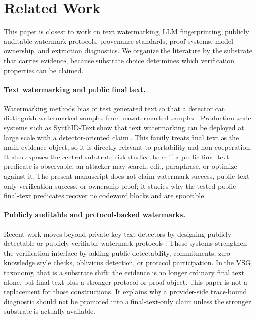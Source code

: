 \section{Related Work}
\label{sec:related}

This paper is closest to work on text watermarking, LLM fingerprinting,
publicly auditable watermark protocols, provenance standards, proof systems,
model ownership, and extraction diagnostics.  We organize the literature by
the substrate that carries evidence, because substrate choice determines which
verification properties can be claimed.

\paragraph{Text watermarking and public final text.}
Watermarking methods bias or test generated text so that a detector can
distinguish watermarked samples from unwatermarked samples
\cite{kirchenbauer2023watermark,zhao2023provable,hu2024unbiased,kuditipudi2024robust,christ2023undetectable,lee2024who,chang2024postmark,huang2025waterpool,dabiriaghdam2025simmark,wouters2024optimizing,liu2024adaptive,zhu2024duwak,lau2024waterfall,jiang2025stealthink}.
Production-scale systems such as SynthID-Text show that text watermarking can
be deployed at large scale with a detector-oriented claim
\cite{dathathri2024scalable}.  This family treats final text as the main
evidence object, so it is directly relevant to portability and
non-cooperation.  It also exposes the central substrate risk studied here: if
a public final-text predicate is observable, an attacker may search, edit,
paraphrase, or optimize against it.  The present manuscript does not claim
watermark success, public text-only verification success, or ownership proof;
it studies why the tested public final-text predicates recover no codeword
blocks and are spoofable.

\paragraph{Publicly auditable and protocol-backed watermarks.}
Recent work moves beyond private-key text detectors by designing publicly
detectable or publicly verifiable watermark protocols
\cite{fairoze2023publicly,isler2023puppy,duan2025pvmark,luan2026vow}.
These systems strengthen the verification interface by adding public
detectability, commitments, zero-knowledge style checks, oblivious detection,
or protocol participation.  In the VSG taxonomy, that is a substrate shift:
the evidence is no longer ordinary final text alone, but final text plus a
stronger protocol or proof object.  This paper is not a replacement for those
constructions.  It explains why a provider-side trace-bound diagnostic should
not be promoted into a final-text-only claim unless the stronger substrate is
actually available.

